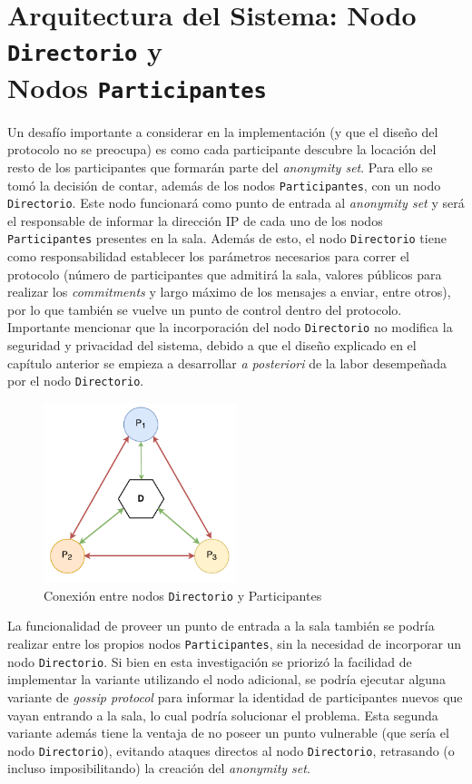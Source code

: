 \section{Arquitectura del Sistema: Nodo \texttt{Directorio} y \\
Nodos \texttt{Participantes}}

Un desafío importante a considerar en la implementación (y que el diseño del 
protocolo no se preocupa) es como cada participante descubre la locación del 
resto de los participantes que formarán parte del \emph{anonymity set}. Para 
ello se tomó la decisión de contar, además de los nodos 
\texttt{Participantes}, con un nodo \texttt{Directorio}. Este nodo funcionará 
como punto de entrada al \emph{anonymity set} y será el responsable de 
informar la dirección IP de cada uno de los nodos \texttt{Participantes} 
presentes en la sala. Además de esto, el nodo \texttt{Directorio} tiene como 
responsabilidad establecer los parámetros necesarios para correr el protocolo 
(número de participantes que admitirá la sala, valores públicos para realizar 
los \emph{commitments} y largo máximo de los mensajes a enviar, entre otros), 
por lo que también se vuelve un punto de control dentro del protocolo. 
Importante mencionar que la incorporación del nodo \texttt{Directorio} no 
modifica la seguridad y privacidad del sistema, debido a que el diseño 
explicado en el capítulo anterior se empieza a desarrollar \emph{a posteriori} 
de la labor desempeñada por el nodo 
\texttt{Directorio}.

\begin{figure}[H]
  \centering
    \includegraphics[width=0.5\textwidth]{imagenes/architecture.pdf}
  \caption{Conexión entre nodos \texttt{Directorio} y Participantes}
  \label{fig:connections-directory-participants}
\end{figure}

La funcionalidad de proveer un punto de entrada a la sala también se podría 
realizar entre los propios nodos \texttt{Participantes}, sin la necesidad de 
incorporar un nodo \texttt{Directorio}. Si bien en esta investigación se 
priorizó la facilidad de implementar la variante utilizando el nodo adicional, 
se podría ejecutar alguna variante de \emph{gossip protocol} 
\cite{Demers:1987:EAR:41840.41841} para informar la identidad de participantes 
nuevos que vayan entrando a la sala, lo cual podría solucionar el problema. 
Esta segunda variante además tiene la ventaja de no poseer un punto vulnerable 
(que sería el nodo \texttt{Directorio}), evitando ataques directos al nodo 
\texttt{Directorio}, retrasando (o incluso imposibilitando) la 
creación del \emph{anonymity set}. 

